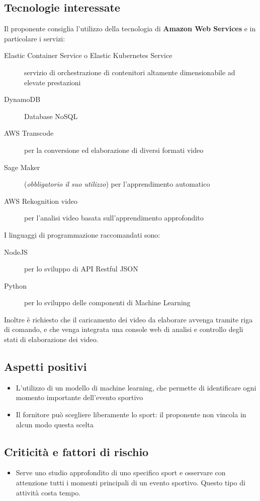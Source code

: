 \documentclass[../studio-di-fattibilita.tex]{subfiles}
\begin{document}
	\subsection{Tecnologie interessate}
	\label{sec:tecnologie_interessate}
	Il proponente consiglia l'utilizzo della tecnologia di \textbf{Amazon Web Services} e in particolare i servizi:
	\begin{description}
		\item[Elastic Container Service o Elastic Kubernetes Service] servizio di orchestrazione di contenitori altamente dimensionabile ad elevate prestazioni
		\item[DynamoDB] Database NoSQL
		\item[AWS Transcode] per la conversione ed elaborazione di diversi formati video
		\item[Sage Maker](\textit{obbligatorio il suo utilizzo}) per l'apprendimento automatico
		\item[AWS Rekognition video] per l'analisi video basata sull'apprendimento approfondito
	\end{description}
	I linguaggi di programmazione raccomandati sono:
	\begin{description}
		\item[NodeJS] per lo sviluppo di API Restful JSON
		\item[Python] per lo sviluppo delle componenti di Machine Learning
	\end{description}
	Inoltre è richiesto che il caricamento dei video da elaborare avvenga tramite riga di comando, e che venga integrata una console web di analisi e controllo degli stati di elaborazione dei video.
	\subsection{Aspetti positivi}
	\label{sec:aspetti_positivi}
	\begin{itemize}
		\item L'utilizzo di un modello di machine learning, che permette di identificare ogni momento importante dell’evento sportivo
		\item Il fornitore può scegliere liberamente lo sport: il proponente non vincola in alcun modo questa scelta
	\end{itemize}
	\subsection{Criticità e fattori di rischio}
	\label{sec:criticità_e_fattori_di_rischio}
	\begin{itemize}
		\item Serve uno studio approfondito di uno specifico sport e osservare con attenzione tutti i momenti principali di un evento sportivo. Questo tipo di attività costa tempo.
	\end{itemize}
\end{document}
